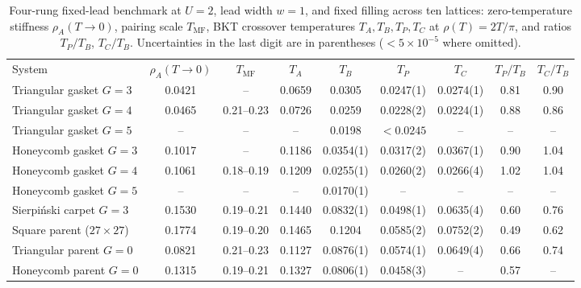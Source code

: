 \documentclass[aps,prb,twocolumn,superscriptaddress,floatfix]{revtex4-2}
\newcommand{\Tmf}{T_{\mathrm{MF}}}
\begin{document}
\begin{table}[t]
\caption{Four-rung fixed-lead benchmark at $U=2$, lead width $w=1$, and fixed filling across ten lattices: zero-temperature stiffness $\rho_A(T\to 0)$, pairing scale $\Tmf$, BKT crossover temperatures $T_A, T_B, T_P, T_C$ at $\rho(T) = 2T/\pi$, and ratios $T_P/T_B$, $T_C/T_B$. Uncertainties in the last digit are in parentheses ($<5\times 10^{-5}$ where omitted).}
\label{tab:u2}
\begin{ruledtabular}
\begin{tabular}{lcccccccc}
System & $\rho_A(T\!\to\!0)$ & $\Tmf$ & $T_A$ & $T_B$ & $T_P$ & $T_C$ & $T_P/T_B$ & $T_C/T_B$ \\
\colrule
Triangular gasket $G=3$ & 0.0421 & -- & 0.0659 & 0.0305 & 0.0247(1) & 0.0274(1) & 0.81 & 0.90 \\
Triangular gasket $G=4$ & 0.0465 & 0.21--0.23 & 0.0726 & 0.0259 & 0.0228(2) & 0.0224(1) & 0.88 & 0.86 \\
Triangular gasket $G=5$ & -- & -- & -- & 0.0198 & $<0.0245$ & -- & -- & -- \\
Honeycomb gasket $G=3$ & 0.1017 & -- & 0.1186 & 0.0354(1) & 0.0317(2) & 0.0367(1) & 0.90 & 1.04 \\
Honeycomb gasket $G=4$ & 0.1061 & 0.18--0.19 & 0.1209 & 0.0255(1) & 0.0260(2) & 0.0266(4) & 1.02 & 1.04 \\
Honeycomb gasket $G=5$ & -- & -- & -- & 0.0170(1) & -- & -- & -- & -- \\
Sierpi\'nski carpet $G=3$ & 0.1530 & 0.19--0.21 & 0.1440 & 0.0832(1) & 0.0498(1) & 0.0635(4) & 0.60 & 0.76 \\
Square parent ($27\times 27$) & 0.1774 & 0.19--0.20 & 0.1465 & 0.1204 & 0.0585(2) & 0.0752(2) & 0.49 & 0.62 \\
Triangular parent $G=0$ & 0.0821 & 0.21--0.23 & 0.1127 & 0.0876(1) & 0.0574(1) & 0.0649(4) & 0.66 & 0.74 \\
Honeycomb parent $G=0$ & 0.1315 & 0.19--0.21 & 0.1327 & 0.0806(1) & 0.0458(3) & -- & 0.57 & -- \\
\end{tabular}
\end{ruledtabular}
\end{table}
\end{document}
